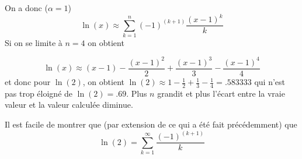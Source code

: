 \documentclass[a4paper] {scrartcl}
\begin{document}
On a donc ($\alpha=1$)
\begin{equation}
	\ln{(x)} \approx \sum_{k=1}^n (-1)^{(k+1)}\frac{(x-1)^k}{k}
\end{equation}
Si on se limite à $n=4$ on obtient

\begin{equation}
	\ln{(x)} \approx (x-1) -\frac{(x-1)^2}{2} + \frac{(x-1)^3}{3} - \frac{(x-1)^4}{4}
\end{equation}
et donc pour $\ln{(2)}$, on obtient $\ln{(2)} \approx 1 - \frac{1}{2}+\frac{1}{3}-\frac{1}{4}=.583333$ qui n'est pas trop éloigné de $\ln{(2)}=.69$. Plus $n$ grandit et plus l'écart entre la vraie valeur et la valeur calculée diminue.



Il est facile de montrer que (par extension de ce qui a été fait précédemment) que
\begin{equation}
	\ln{(2)} = \sum_{k=1}^\infty \frac{(-1)^{(k+1)}}{k}
\end{equation}
\end{document}
